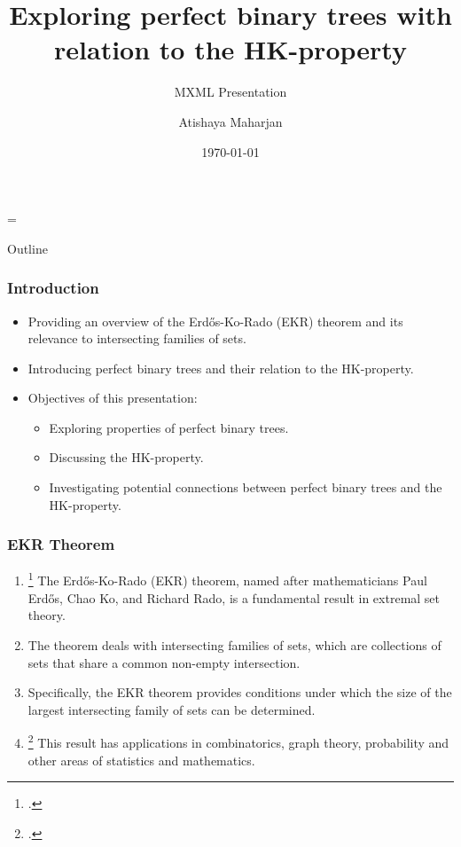 \documentclass[10pt,]{beamer}
\title[HK-property | Perfect Binary Trees]{Exploring perfect binary trees with relation to the HK-property}
\subtitle{MXML Presentation} %
\author[A.M]{Atishaya Maharjan}
\date{\today}
\theoremstyle{conjectureStyle}
\theoremstyle{notationStyle}
\theoremstyle{claimStyle}
\begin{document}
\parskip = \baselineskip

\begin{frame} %
    \titlepage
\end{frame}

\begin{frame}{Outline}
    \tableofcontents
\end{frame}

\begin{frame}
    \frametitle{Introduction}
    \begin{itemize}
        \item Providing an overview of the Erdős-Ko-Rado (EKR) theorem and its relevance to intersecting families of sets.
        \item Introducing perfect binary trees and their relation to the HK-property.
        \item Objectives of this presentation:
              \begin{itemize}
                  \item Exploring properties of perfect binary trees.
                  \item Discussing the HK-property.
                  \item Investigating potential connections between perfect binary trees and the HK-property.
              \end{itemize}
    \end{itemize}
\end{frame}

\begin{frame}\frametitle{EKR Theorem}
    \begin{enumerate}[<+->]
        \item \footcite{Erds1961INTERSECTIONTF} The Erdős-Ko-Rado (EKR) theorem, named after mathematicians Paul Erdős, Chao Ko, and Richard Rado, is a fundamental result in extremal set theory.
        \item The theorem deals with intersecting families of sets, which are collections of sets that share a common non-empty intersection.
        \item  Specifically, the EKR theorem provides conditions under which the size of the largest intersecting family of sets can be determined.
        \item \footcite{MR0892525} This result has applications in combinatorics, graph theory, probability and other areas of statistics and mathematics.
    \end{enumerate}
\end{frame}
\end{document}
